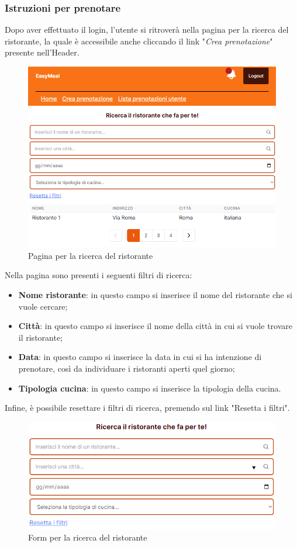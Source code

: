 \newpage
\subsubsection{Istruzioni per prenotare}
Dopo aver effettuato il login, l'utente si ritroverà nella pagina per la ricerca del ristorante, la quale è accessibile anche cliccando il link "\emph{Crea prenotazione}" presente nell'Header.
\begin{figure}[H]
    \centering
    \includegraphics[width=0.6\linewidth]{img/ricerca_ristorante.png}
    \caption{Pagina per la ricerca del ristorante}
    \label{fig:ricerca_ristorante}
\end{figure}
Nella pagina sono presenti i seguenti filtri di ricerca:
\begin{itemize}
    \item \textbf{Nome ristorante}: in questo campo si inserisce il nome del ristorante che si vuole cercare;
    \item \textbf{Città}: in questo campo si inserisce il nome della città in cui si vuole trovare il ristorante;
    \item \textbf{Data}: in questo campo si inserisce la data in cui si ha intenzione di prenotare, così da individuare i ristoranti aperti quel giorno;
    \item \textbf{Tipologia cucina}: in questo campo si inserisce la tipologia della cucina.
\end{itemize}
Infine, è possibile resettare i filtri di ricerca, premendo sul link "Resetta i filtri".
\begin{figure}[H]
    \centering
    \includegraphics[width=0.6\linewidth]{img/form_ricerca.png}
    \caption{Form per la ricerca del ristorante}
    \label{fig:form_ricerca}
\end{figure}
